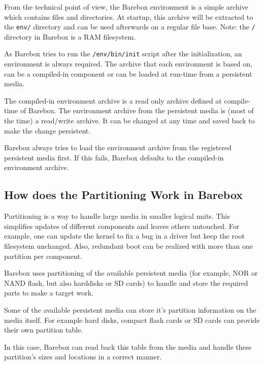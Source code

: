 From the technical point of view, the Barebox environment is a simple
archive which contains files and directories. At startup, this archive will
be extracted to the \texttt{env/} directory and can be used afterwards on a
regular file base. Note: the \texttt{/} directory in Barebox is a RAM
filesystem.

As Barebox tries to run the \texttt{/env/bin/init} script after the
initialization, an environment is always required. The archive that each
environment is based on, can be a compiled-in component or can be loaded at
run-time from a persistent media.

The compiled-in environment archive is a read only archive defined at
compile-time of Barebox. The environment archive from the persistent
media is (most of the time) a read/write archive. It can be changed at any
time and saved back to make the change persistent.

Barebox always tries to load the environment archive from the registered
persistent media first. If this fails, Barebox defaults to the compiled-in
environment archive.


\subsection{How does the Partitioning Work in Barebox}	\label{sec:bbpartitioning}

Partitioning is a way to handle large media in smaller logical units. This
simplifies updates of different components and leaves others untouched. For
example, one can update the kernel to fix a bug in a driver but keep the
root filesystem unchanged. Also, redundant boot can be realized with more than
one partition per component.

%
%

Barebox uses partitioning of the available persistent media (for example, NOR
or NAND flash, but also harddisks or SD cards) to handle and store the
required parts to make a target work.

Some of the available persistent media can store it's partition information on
the media itself. For example hard disks, compact flash cards or SD cards can
provide their own partition table.

In this case, Barebox can read back this table from the media and handle
these partition's sizes and locations in a correct manner.

